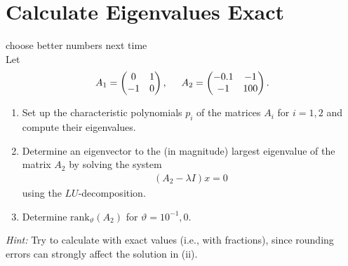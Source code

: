 \section{Calculate Eigenvalues Exact}
{\color{red} choose better numbers next time}\\
Let 
\begin{align*}
A_1 = \begin{pmatrix}
0&1\\
-1&0
\end{pmatrix},
\hspace{.5cm}
A_2 = \begin{pmatrix}
-0.1&-1\\
-1&100
\end{pmatrix}.
\end{align*}
\begin{enumerate}
	\item Set up the characteristic polynomials $p_i$ of the matrices $A_i$ for $i=1,2$ and compute their eigenvalues.
	\item Determine an eigenvector to the (in magnitude) largest eigenvalue of the matrix $A_2$ by solving the system
	\begin{align*}
	(A_2 - \lambda I)x  = 0
	\end{align*}
	using the $LU$-decomposition. 
	\item Determine $\text{rank}_{\vartheta}(A_2)$ for $\vartheta = 10^{-1}, 0$.
\end{enumerate}
\textit{Hint: }Try to calculate with exact values (i.e., with fractions), since rounding errors can strongly affect the solution in (ii).